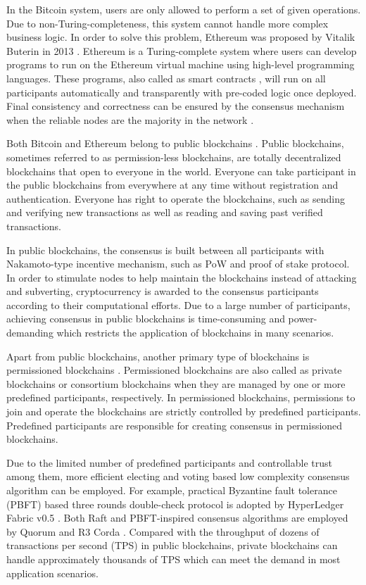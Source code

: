 \documentclass[journal]{IEEEtran}
\begin{document}
{
\color{red}
In the Bitcoin system, users are only allowed to perform a set of given operations. Due to non-Turing-completeness, this system cannot handle more complex business logic. In order to solve this problem, Ethereum was proposed by Vitalik Buterin in 2013 \cite{VButerin}. Ethereum is a Turing-complete system where users can develop programs to run on the Ethereum virtual machine using high-level programming languages. These programs, also called as smart contracts \cite{NSzabo}, will run on all participants automatically and transparently with pre-coded logic once deployed. Final consistency and correctness can be ensured by the consensus mechanism when the reliable nodes are the majority in the network \cite{VButerin}.

Both Bitcoin and Ethereum belong to public blockchains \cite{VButerin2}. Public blockchains, sometimes referred to as permission-less blockchains, are totally decentralized blockchains that open to everyone in the world. Everyone can take participant in the public blockchains from everywhere at any time without registration and authentication. Everyone has right to operate the blockchains, such as sending and verifying new transactions as well as reading and saving past verified transactions.

In public blockchains, the consensus is built between all participants with  Nakamoto-type incentive mechanism, such as PoW and proof of stake \cite{POS
} protocol. In order to stimulate nodes to help maintain the blockchains instead of attacking and subverting, cryptocurrency is awarded to the consensus participants according to their computational efforts. Due to a large number of participants, achieving consensus in public blockchains is time-consuming and power-demanding which restricts the application of blockchains in many scenarios.

Apart from public blockchains, another primary type of blockchains is permissioned blockchains \cite{MVukoli}. Permissioned blockchains are also called as private blockchains or consortium blockchains when they are managed by one or more predefined participants, respectively. In permissioned blockchains,  permissions to join and operate the blockchains are strictly controlled by predefined participants. Predefined participants are responsible for creating consensus in permissioned blockchains.

Due to the limited number of predefined participants and controllable trust among them, more efficient electing and voting based low complexity consensus algorithm can be employed. For example,  practical Byzantine fault tolerance (PBFT) \cite{MCastro} based three rounds double-check protocol is adopted by HyperLedger Fabric v0.5 \cite{CCachin}. Both Raft \cite{DOngaro} and PBFT-inspired consensus algorithms are employed by Quorum \cite{Quorum} and R3 Corda \cite{RGBrown}. Compared with the throughput of dozens of transactions per second (TPS) in public blockchains, private blockchains can handle approximately thousands of TPS \cite{TTADinh} which can meet the demand in most application scenarios.

}
\end{document}
